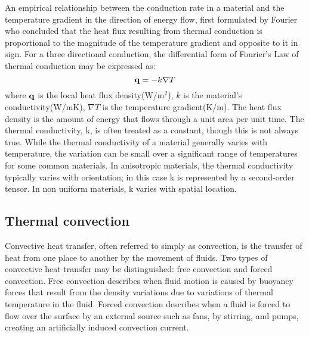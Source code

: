 

An empirical relationship between the conduction rate in a material and the temperature gradient in the direction of energy flow, first formulated by Fourier who concluded that the heat flux resulting from thermal conduction is proportional to the magnitude of the temperature gradient and opposite to it in sign.
For a three directional conduction, the differential form of Fourier's Law of thermal conduction may be expressed as:
\begin{equation}
{\bf{q}} =  - k\nabla T
\end{equation}
where $\bf{q}$ is the local heat flux density(W/m$^2$), $k$ is the material's conductivity(W/mK), $\nabla T$ is the temperature gradient(K/m).
The heat flux density is the amount of energy that flows through a unit area per unit time.
The thermal conductivity, k, is often treated as a constant, though this is not always true.
While the thermal conductivity of a material generally varies with temperature, the variation can be small over a significant range of temperatures for some common materials.
In anisotropic materials, the thermal conductivity typically varies with orientation; in this case k is represented by a second-order tensor. In non uniform materials, k varies with spatial location.

\subsection{Thermal convection}
\noindent
Convective heat transfer, often referred to simply as convection, is the transfer of heat from one place to another by the movement of fluids.
Two types of convective heat transfer may be distinguished: free convection and forced convection.
Free convection describes when fluid motion is caused by buoyancy forces that result from the density variations due to variations of thermal temperature in the fluid.
Forced convection describes when a fluid is forced to flow over the surface by an external source such as fans, by stirring, and pumps, creating an artificially induced convection current.

